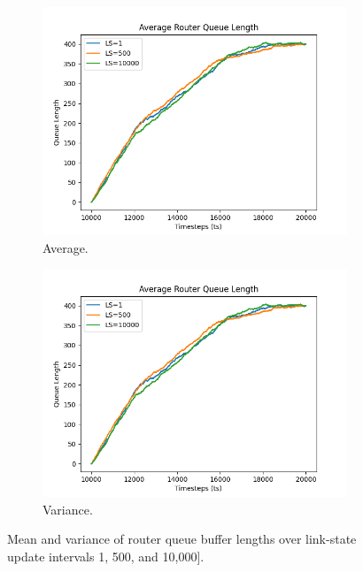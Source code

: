 \captionsetup{justification=centering}
\begin{figure}[H]
    \centering
    \begin{subfigure}{0.475\textwidth}
        \includegraphics[width=\textwidth]{figs/appendix/average_of_1,500,10000.png}
        \caption{Average.}
        \label{fig:Ravgq}
    \end{subfigure}
    \hfill
    \begin{subfigure}{0.475\textwidth}
        \includegraphics[width=\textwidth]{figs/appendix/average_of_1,500,10000.png}
        \caption[]{Variance.}
        \label{fig:Rvarq}
    \end{subfigure}
    \caption{Mean and variance of router queue buffer lengths over link-state update intervals 1, 500, and 10,000].}
\end{figure}

